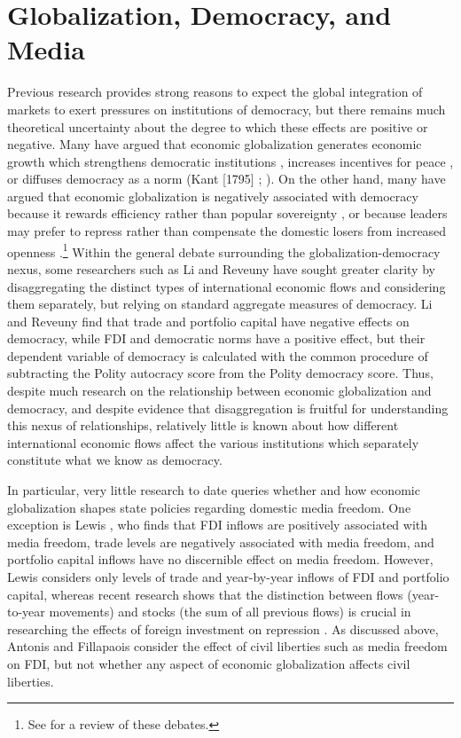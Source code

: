 \documentclass[12pt,a4paper]{article}
\begin{document}
\section{Globalization, Democracy, and Media}

Previous research provides strong reasons to expect the global integration of markets to exert pressures on institutions of democracy, but there remains much theoretical uncertainty about the degree to which these effects are positive or negative. Many have argued that economic globalization generates economic growth which strengthens democratic institutions \parencites{Baghwati:1997vy}{Im:1996cl}, increases incentives for peace \parencites{Baghwati:1997vy}{Oneal:1999fc}, or diffuses democracy as a norm (Kant [1795] \cite*{Kant:1983uf}; \cite{Limongi:1996dr}). On the other hand, many have argued that economic globalization is negatively associated with democracy because it rewards efficiency rather than popular sovereignty \parencites{Huntington:1975vt}{Lindblom:1977ue}{Cammack:1998gf}, or because leaders may prefer to repress rather than compensate the domestic losers from increased openness \parencite{Adsera:2002vt}.\footnote{See \cite{Milner:2009hi} for a review of these debates.} Within the general debate surrounding the globalization-democracy nexus, some researchers such as Li and Reveuny \parencite*{Li:2003vj} have sought greater clarity by disaggregating the distinct types of international economic flows and considering them separately, but relying on standard aggregate measures of democracy. Li and Reveuny find that trade and portfolio capital have negative effects on democracy, while FDI and democratic norms have a positive effect, but their dependent variable of democracy is calculated with the common procedure of subtracting the Polity autocracy score from the Polity democracy score. Thus, despite much research on the relationship between economic globalization and democracy, and despite evidence that disaggregation is fruitful for understanding this nexus of relationships, relatively little is known about how different international economic flows affect the various institutions which separately constitute what we know as democracy.

In particular, very little research to date queries whether and how economic globalization shapes state policies regarding domestic media freedom. One exception is Lewis \parencite*{Lewis:qDvYbWlU}, who finds that FDI inflows are positively associated with media freedom, trade levels are negatively associated with media freedom, and portfolio capital inflows have no discernible effect on media freedom. However, Lewis considers only levels of trade and year-by-year inflows of FDI and portfolio capital, whereas recent research shows that the distinction between flows (year-to-year movements) and stocks (the sum of all previous flows) is crucial in researching the effects of foreign investment on repression \parencite{Sorens:2012hc}. As discussed above, Antonis and Fillapaois \parencite*{Adam:2007gn} consider the effect of civil liberties such as media freedom on FDI, but not whether any aspect of economic globalization affects civil liberties.
\end{document}
